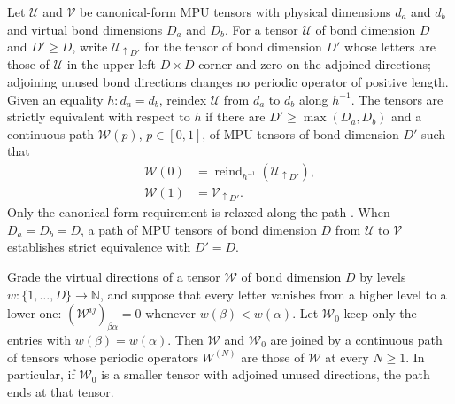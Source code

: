 \begin{definition}
    \label{def:strictly-equivalent-tensors}
    \leanok
    Let $\mathcal U$ and $\mathcal V$ be canonical-form MPU tensors with
    physical dimensions $d_a$ and $d_b$ and virtual bond dimensions $D_a$ and
    $D_b$. For a tensor $\mathcal U$ of bond dimension $D$ and $D'\geq D$,
    write $\mathcal U_{\uparrow D'}$ for the tensor of
    bond dimension $D'$ whose letters are those of $\mathcal U$ in the upper
    left $D\times D$ corner and zero on the adjoined directions; adjoining
    unused bond directions changes no periodic operator of positive length.
    Given an equality $h\colon d_a=d_b$, reindex $\mathcal U$ from $d_a$ to
    $d_b$ along $h^{-1}$. The tensors are strictly equivalent with respect to
    $h$ if there are $D'\geq\max(D_a,D_b)$ and a continuous path
    $\mathcal W(p)$, $p\in[0,1]$, of MPU tensors of bond dimension $D'$ such
    that
    \begin{align}
        \mathcal W(0) & =\operatorname{reind}_{h^{-1}}(\mathcal U_{\uparrow D'}), \\
        \mathcal W(1) & =\mathcal V_{\uparrow D'}.
    \end{align}
    Only the canonical-form requirement is relaxed along the path
    \cite[lines~708--714]{Cirac2017MPU}. When $D_a=D_b=D$, a path of MPU
    tensors of bond dimension $D$ from $\mathcal U$ to $\mathcal V$ establishes
    strict equivalence with $D'=D$.
\end{definition}

\begin{lemma}
    \label{lem:mpu_level_triangular_reduction}
    \leanok
    Grade the virtual directions of a tensor $\mathcal W$ of bond dimension $D$
    by levels $w\colon\{1,\ldots,D\}\to\mathbb N$, and suppose that every letter
    vanishes from a higher level to a lower one:
    $(\mathcal W^{ij})_{\beta\alpha}=0$ whenever $w(\beta)<w(\alpha)$. Let
    $\mathcal W_0$ keep only the entries with $w(\beta)=w(\alpha)$. Then
    $\mathcal W$ and $\mathcal W_0$ are joined by a continuous path of tensors
    whose periodic operators $W^{(N)}$ are those of $\mathcal W$ at every
    $N\geq1$. In particular, if $\mathcal W_0$ is a smaller tensor with
    adjoined unused directions, the path ends at that tensor.
\end{lemma}

